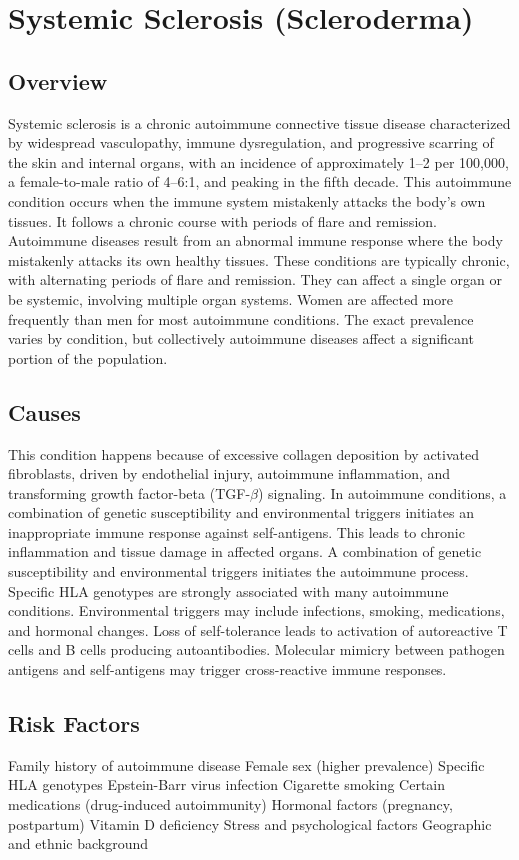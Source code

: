 \chapter{Systemic Sclerosis (Scleroderma)}
\label{sec:Systemic Sclerosis (Scleroderma)}

\section{Overview}
Systemic sclerosis is a chronic autoimmune connective tissue disease characterized by widespread vasculopathy, immune dysregulation, and progressive scarring of the skin and internal organs, with an incidence of approximately 1--2 per 100,000, a female-to-male ratio of 4--6:1, and peaking in the fifth decade. This autoimmune condition occurs when the immune system mistakenly attacks the body's own tissues. It follows a chronic course with periods of flare and remission. Autoimmune diseases result from an abnormal immune response where the body mistakenly attacks its own healthy tissues. These conditions are typically chronic, with alternating periods of flare and remission. They can affect a single organ or be systemic, involving multiple organ systems. Women are affected more frequently than men for most autoimmune conditions. The exact prevalence varies by condition, but collectively autoimmune diseases affect a significant portion of the population.
\section{Causes}
This condition happens because of excessive collagen deposition by activated fibroblasts, driven by endothelial injury, autoimmune inflammation, and transforming growth factor-beta (TGF-$\beta$) signaling. In autoimmune conditions, a combination of genetic susceptibility and environmental triggers initiates an inappropriate immune response against self-antigens. This leads to chronic inflammation and tissue damage in affected organs. A combination of genetic susceptibility and environmental triggers initiates the autoimmune process. Specific HLA genotypes are strongly associated with many autoimmune conditions. Environmental triggers may include infections, smoking, medications, and hormonal changes. Loss of self-tolerance leads to activation of autoreactive T cells and B cells producing autoantibodies. Molecular mimicry between pathogen antigens and self-antigens may trigger cross-reactive immune responses.
\section{Risk Factors}
Family history of autoimmune disease Female sex (higher prevalence) Specific HLA genotypes Epstein-Barr virus infection Cigarette smoking Certain medications (drug-induced autoimmunity) Hormonal factors (pregnancy, postpartum) Vitamin D deficiency Stress and psychological factors Geographic and ethnic background

